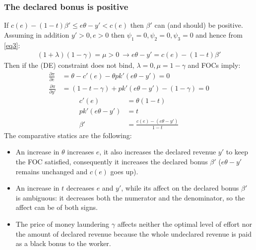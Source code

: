 \documentclass[a4paper]{article}
\begin{document}
\subsubsection{The declared bonus is positive}
If $c(e) - (1-t)\beta' \le e \theta - y' < c(e)$ then $\beta'$ can (and should) be positive.
Assuming in addition $y' > 0, e > 0$ then $\psi_1 = 0, \psi_2 = 0, \psi_3= 0$ and hence from \eqref{eq3}:
\begin{align*}
(1 + \lambda)(1 - \gamma) = \mu > 0\ \to e \theta - y' = c(e) - (1 - t)\beta'
\end{align*}
Then if the (DE) constraint does not bind, $\lambda = 0, \mu = 1 - \gamma$ and FOCs imply:
\begin{align*}
\frac{\partial \pi}{\partial e} &= \theta - c'(e) - \theta p k'(e\theta - y') = 0\\
\frac{\partial \pi}{\partial y'} &= (1 - t - \gamma)+pk'(e\theta - y') - (1-\gamma) = 0
\end{align*}
\begin{align*}
c'(e) &= \theta(1 - t)\\
pk'(e\theta - y') &= t\\
\beta' &= \frac{c(e) - (e\theta - y')}{1-t}
\end{align*}
The comparative statics are the following:
\begin{itemize}
\item An increase in $\theta$ increases $e$, 
it also increases the declared revenue $y'$ to keep the FOC satisfied, consequently it increases the declared bonus $\beta'$ ($e \theta - y'$ remains unchanged and $c(e)$ goes up).
\item An increase in $t$ decreases $e$ and $y'$, while its affect on the declared bonus $\beta'$ is ambiguous: it decreases both the numerator and the denominator, so the affect can be of both signs.
\item The price of money laundering $\gamma$ affects neither the optimal level of effort nor the amount of declared revenue because the whole undeclared revenue is paid as a black bonus to the worker.
\end{itemize}
\end{document}
